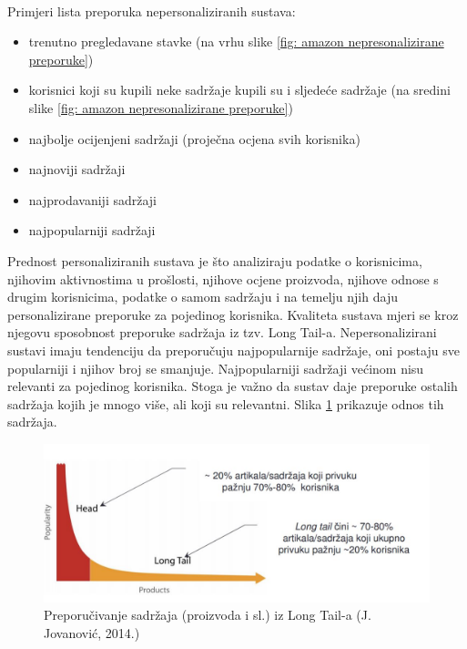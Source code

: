 \documentclass[a4paper,oneside,12pt]{memoir} %
\begin{document}
\\ Primjeri lista preporuka nepersonaliziranih sustava:
\begin{itemize}[topsep=2pt]
\setlength{\parskip}{0pt}
\item trenutno pregledavane stavke (na vrhu slike \ref{fig: amazon nepresonalizirane preporuke})
\item korisnici koji su kupili neke sadržaje kupili su i sljedeće sadržaje (na sredini slike \ref{fig: amazon nepresonalizirane preporuke})
\item najbolje ocijenjeni sadržaji (proječna ocjena svih korisnika)
\item najnoviji sadržaji
\item najprodavaniji sadržaji
\item najpopularniji sadržaji
\end{itemize}
\bigskip
\par 
Prednost personaliziranih sustava je što analiziraju podatke o korisnicima, njihovim aktivnostima u prošlosti, njihove ocjene proizvoda, njihove odnose s drugim korisnicima, podatke o samom sadržaju i na temelju njih daju personalizirane preporuke za pojedinog korisnika. Kvaliteta sustava mjeri se kroz njegovu sposobnost preporuke sadržaja iz tzv. Long Tail-a. Nepersonalizirani sustavi imaju tendenciju da preporučuju najpopularnije sadržaje, oni postaju sve popularniji i njihov broj se smanjuje. Najpopularniji sadržaji većinom nisu relevanti za pojedinog korisnika. Stoga je važno da sustav daje preporuke ostalih sadržaja kojih je mnogo više, ali koji su relevantni. Slika \ref{fig: long tail} prikazuje odnos tih sadržaja.
\begin{figure}[!h]
\begin{center}
\includegraphics[scale=0.6]{slike/long_tail.jpg}
\caption{Preporučivanje sadržaja (proizvoda i sl.) iz Long Tail-a (J. Jovanović, 2014.)}
\label{fig: long tail}
\end{center}
\end{figure}
\end{document}
